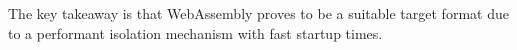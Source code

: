 The key takeaway is that WebAssembly proves to be a suitable target format due to a performant isolation mechanism with fast startup times.











